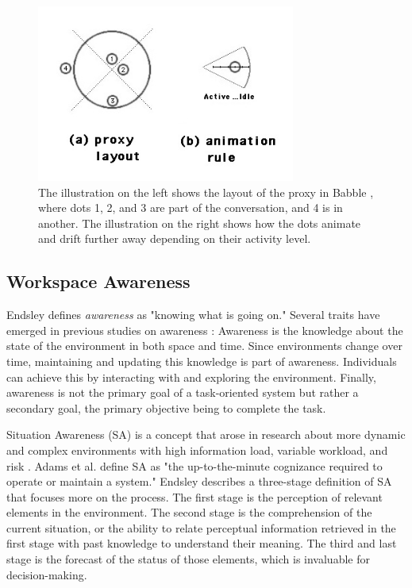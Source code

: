     \begin{figure}
        \centering
        \includegraphics[width=0.5\linewidth]{figures/babble.png}
        \caption{The illustration on the left shows the layout of the proxy in Babble \cite{ericksonSocialTranslucenceApproach2000}, where dots 1, 2, and 3 are part of the conversation, and 4 is in another. The illustration on the right shows how the dots animate and drift further away depending on their activity level.}
        \label{fig:babble}
    \end{figure}

    \subsection{Workspace Awareness} \label{sec:sota_awareness}
    
    Endsley \cite{endsleyTheorySituationAwareness1995} defines \textit{awareness} as "knowing what is going on." Several traits have emerged in previous studies on awareness \cite{adamsSituationAwarenessCognitive1995, normanThingsThatMake1993, endsleyTheorySituationAwareness1995, gutwinDescriptiveFrameworkWorkspace2002}: Awareness is the knowledge about the state of the environment in both space and time. Since environments change over time, maintaining and updating this knowledge is part of awareness. Individuals can achieve this by interacting with and exploring the environment. Finally, awareness is not the primary goal of a task-oriented system but rather a secondary goal, the primary objective being to complete the task.

    Situation Awareness (SA) is a concept that arose in research about more dynamic and complex environments with high information load, variable workload, and risk \cite{gabaSituationAwarenessAnesthesiology1995}. Adams et al. \cite{adamsSituationAwarenessCognitive1995} define SA as "the up-to-the-minute cognizance required to operate or maintain a system." Endsley \cite{endsleyTheorySituationAwareness1995} describes a three-stage definition of SA that focuses more on the process. The first stage is the perception of relevant elements in the environment. The second stage is the comprehension of the current situation, or the ability to relate perceptual information retrieved in the first stage with past knowledge to understand their meaning. The third and last stage is the forecast of the status of those elements, which is invaluable for decision-making.
    

